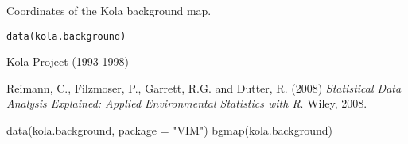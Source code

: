 %
\begin{Description}\relax
Coordinates of the Kola background map.
\end{Description}
%
\begin{Usage}
\begin{verbatim}
data(kola.background)
\end{verbatim}
\end{Usage}
%
\begin{Source}\relax
Kola Project (1993-1998)
\end{Source}
%
\begin{References}\relax
Reimann, C., Filzmoser, P., Garrett, R.G. and Dutter, R. (2008) 
\emph{Statistical Data Analysis Explained: Applied Environmental
Statistics with R}. Wiley, 2008.
\end{References}
%
\begin{Examples}
\begin{ExampleCode}
data(kola.background, package = "VIM")
bgmap(kola.background)
\end{ExampleCode}
\end{Examples}
